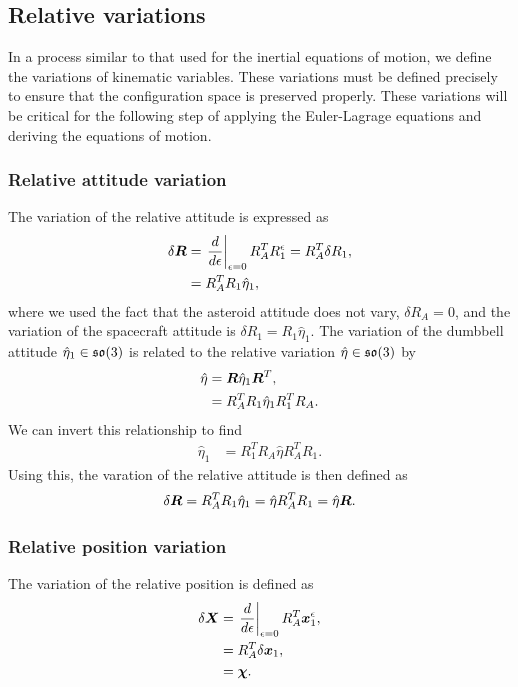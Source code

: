 \subsection{Relative variations}\label{ssec:relative_variations}
In a process similar to that used for the inertial equations of motion, we define the variations of kinematic variables.
These variations must be defined precisely to ensure that the configuration space is preserved properly. 
These variations will be critical for the following step of applying the Euler-Lagrage equations and deriving the equations of motion.

\subsubsection{Relative attitude variation}
The variation of the relative attitude is expressed as
\begin{align*}
    \delta \bm{R} &= \left. \frac{d }{d \epsilon} \right|_{\epsilon=0}  R_A^T R_1^\epsilon = R_A^T \delta R_1, \\
                  &= R_A^T R_1 \hat{\eta}_1,
\end{align*}
where we used the fact that the asteroid attitude does not vary, \( \delta R_A = 0\), and the variation of the spacecraft attitude is \( \delta R_1 = R_1 \hat{\eta}_1\).
The variation of the dumbbell attitude \( \hat{\eta}_1 \in \mathfrak{so}(3) \) is related to the relative variation \( \hat{\eta} \in \mathfrak{so}(3) \) by
\begin{align*}
    \hat{\eta} &= \bm{R} \hat{\eta}_1 \bm{R}^T ,\\
               &= R_A^T R_1 \hat{\eta}_1 R_1^T R_A .
\end{align*}
We can invert this relationship to find
\begin{align*}
    \hat{\eta}_1 &= R_1^T R_A \hat{\eta} R_A^T R_1 .
\end{align*}
Using this, the varation of the relative attitude is then defined as
\begin{align}\label{eq:relative_attitude_variation}
    \delta \bm{R} = R_A^T R_1 \hat{\eta}_1 = \hat{\eta} R_A^T R_1 = \hat{\eta} \bm{R}.
\end{align}

\subsubsection{Relative position variation}
The variation of the relative position is defined as
\begin{align}\label{eq:relative_position_variation}
    \delta \bm{X} &= \left. \frac{d }{d \epsilon} \right|_{\epsilon=0} R_A^T \bm{x}_1^\epsilon ,\nonumber \\
     &= R_A^T \delta \bm{x}_1 , \nonumber\\
     &= \bm{\chi} .
\end{align}

